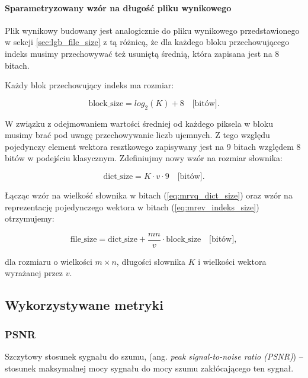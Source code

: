 \documentclass{article}
\begin{document}
\paragraph{Sparametryzowany wzór na długość pliku wynikowego}

Plik wynikowy budowany jest analogicznie do pliku wynikowego przedstawionego w sekcji \ref{sec:lgb_file_size} z tą różnicą, że dla każdego bloku przechowującego indeks musimy przechowywać też usuniętą średnią, która zapisana jest na $8$ bitach.

Każdy blok przechowujący indeks ma rozmiar:

\begin{equation}
  \textrm{block\_size} = log_2(K) + 8 \quad  \textrm{[bitów]}.
  \label{eq:mrev_indeks_size}
\end{equation}

W związku z odejmowaniem wartości średniej od każdego piksela w bloku musimy brać pod uwagę przechowywanie liczb ujemnych. Z tego względu pojedynczy element wektora resztkowego zapisywany jest na 9 bitach względem 8 bitów w podejściu klasycznym. Zdefiniujmy nowy wzór na rozmiar słownika:

\begin{equation}
  \textrm{dict\_size} = K \cdot v \cdot 9 \quad \textrm{[bitów]}.
  \label{eq:mrvq_dict_size}
\end{equation}

Łącząc wzór na wielkość słownika w bitach (\ref{eq:mrvq_dict_size}) oraz wzór na reprezentację pojedynczego wektora w bitach (\ref{eq:mrev_indeks_size}) otrzymujemy:

\begin{equation}
  \textrm{file\_size} = \textrm{dict\_size} + \frac{mn}{v} \cdot \textrm{block\_size}  \quad  \textrm{[bitów]},
  \label{eq:mrvq_image_size}
\end{equation}

dla rozmiaru o wielkości $m \times n$, długości słownika $K$ i wielkości wektora wyrażanej przez $v$.

\subsection{Wykorzystywane metryki}

\subsubsection{PSNR}

Szczytowy stosunek sygnału do szumu, (ang. \emph{peak signal-to-noise ratio (PSNR)}) – stosunek maksymalnej mocy sygnału do mocy szumu zakłócającego ten sygnał.  
\end{document}
